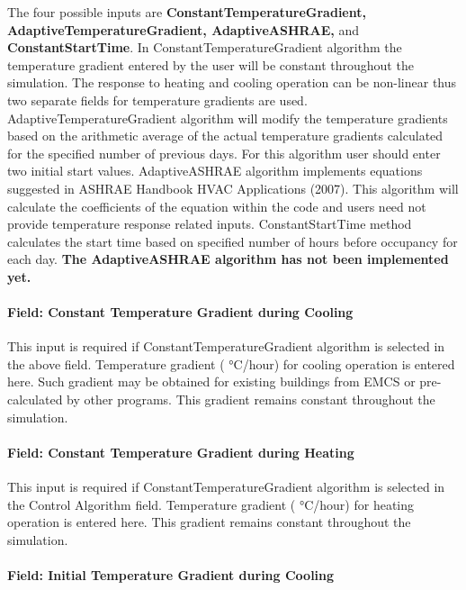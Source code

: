 The four possible inputs are \textbf{ConstantTemperatureGradient, AdaptiveTemperatureGradient, AdaptiveASHRAE,} and \textbf{ConstantStartTime}. In ConstantTemperatureGradient algorithm the temperature gradient entered by the user will be constant throughout the simulation. The response to heating and cooling operation can be non-linear thus two separate fields for temperature gradients are used. AdaptiveTemperatureGradient algorithm will modify the temperature gradients based on the arithmetic average of the actual temperature gradients calculated for the specified number of previous days. For this algorithm user should enter two initial start values. AdaptiveASHRAE algorithm implements equations suggested in ASHRAE Handbook HVAC Applications (2007). This algorithm will calculate the coefficients of the equation within the code and users need not provide temperature response related inputs. ConstantStartTime method calculates the start time based on specified number of hours before occupancy for each day. \textbf{The AdaptiveASHRAE algorithm has not been implemented yet.}

\paragraph{Field: Constant Temperature Gradient during Cooling}\label{field-constant-temperature-gradient-during-cooling}

This input is required if ConstantTemperatureGradient algorithm is selected in the above field. Temperature gradient ( °C/hour) for cooling operation is entered here. Such gradient may be obtained for existing buildings from EMCS or pre-calculated by other programs. This gradient remains constant throughout the simulation.

\paragraph{Field: Constant Temperature Gradient during Heating}\label{field-constant-temperature-gradient-during-heating}

This input is required if ConstantTemperatureGradient algorithm is selected in the Control Algorithm field. Temperature gradient ( °C/hour) for heating operation is entered here. This gradient remains constant throughout the simulation.

\paragraph{Field: Initial Temperature Gradient during Cooling}\label{field-initial-temperature-gradient-during-cooling}

